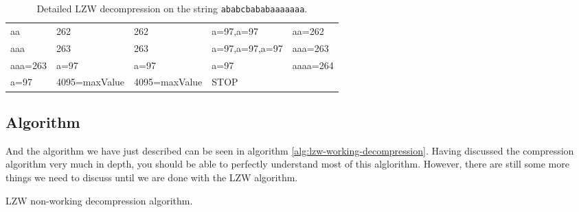 \begin{refsection}
\begin{table}
{\begin{tabular}{lllll}
    aa & 262 & 262 & a=97,a=97 & aa=262 \\

    aaa & 263 & 263 & a=97,a=97,a=97 & aaa=263 \\

    aaa=263 & a=97 & a=97 & a=97 & aaaa=264  \\

    a=97 & 4095=maxValue & 4095=maxValue & STOP &  \\

    \bottomrule
  \end{tabular}}
  \caption{Detailed LZW decompression on the string \texttt{ababcbababaaaaaaa}.}
  \label{tab:lzw-dec-walkthru}
\end{table}

\subsection{Algorithm}

And the algorithm we have just described can be seen in algorithm
\ref{alg:lzw-working-decompression}. Having discussed the
compression algorithm very much in depth, you should be able to
perfectly understand most of this alglorithm. However, there are still
some more things we need to discuss until we are done with the LZW
algorithm.

\begin{algorithm}[H]
  \caption{LZW non-working decompression algorithm.}
  \label{alg:lzw-working-decompression}
  \begin{algorithmic}[1]
    \State {}



       
      \Else
      \EndIf

      \State {}

       

      \State {}



\end{algorithmic}
\end{algorithm}
\end{refsection}
